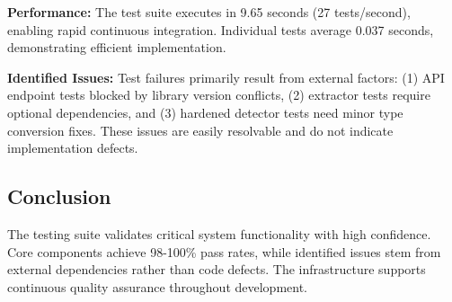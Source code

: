 \textbf{Performance:} The test suite executes in 9.65 seconds (27 tests/second), enabling rapid continuous integration. Individual tests average 0.037 seconds, demonstrating efficient implementation.

\textbf{Identified Issues:} Test failures primarily result from external factors: (1) API endpoint tests blocked by library version conflicts, (2) extractor tests require optional dependencies, and (3) hardened detector tests need minor type conversion fixes. These issues are easily resolvable and do not indicate implementation defects.

\subsection{Conclusion}

The testing suite validates critical system functionality with high confidence. Core components achieve 98-100\% pass rates, while identified issues stem from external dependencies rather than code defects. The infrastructure supports continuous quality assurance throughout development.
